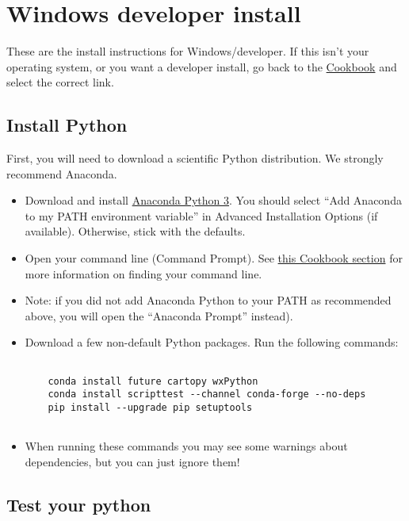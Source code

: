 \documentclass[11pt]{article}
\begin{document}
\tableofcontents


\section{Windows developer install}

These are the install instructions for Windows/developer.  If this isn't your operating system, or you want a developer install, go back to the \href{https://earthref.org/PmagPy/cookbook/#next_steps}{Cookbook} and select the correct link.


\subsection{Install Python}

First, you will need to download a scientific Python distribution.  We strongly recommend Anaconda.

   \begin{itemize}
   \item Download and install \href{https://www.anaconda.com/download}{Anaconda Python 3}.  You should select ``Add Anaconda to my PATH environment variable'' in Advanced Installation Options (if available).  Otherwise, stick with the defaults.
   \item Open your command line (Command Prompt). See \href{https://earthref.org/PmagPy/cookbook/#command_line}{this Cookbook section} for more information on finding your command line.
   \item Note: if you did not add Anaconda Python to your PATH as recommended above, you will open the ``Anaconda Prompt'' instead).
   \item Download a few non-default Python packages.  Run the following commands: \begin{verbatim}

    conda install future cartopy wxPython
    conda install scripttest --channel conda-forge --no-deps
    pip install --upgrade pip setuptools


\end{verbatim}
   \item When running these commands you may see some warnings about dependencies, but you can just ignore them!

\end{itemize}

\subsection{Test your python}
\end{document}
